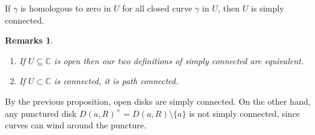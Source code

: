 \documentclass{article}
\theoremstyle{plain}\theoremheaderfont{\normalfont\itshape}\theorembodyfont{\rmfamily}\theoremseparator{.}\newtheorem*{rem}{Remark}\newtheorem*{ex}{Example}\newtheorem*{proof}{Proof}\newtheorem*{altp}{Alternative proof}\newtheorem*{con}{Consequences}\newtheorem*{notn}{Notations}\newtheorem*{cau}{Caution}\newtheorem*{term}{Terminology}\newtheorem*{keyex}{Key example}
\theoremstyle{plain}\theoremheaderfont{\normalfont\bfseries}\theorembodyfont{\rmfamily}\theoremseparator{.}\newtheorem{thm}{Theorem}[section]\newtheorem{lem}[thm]{Lemma}\newtheorem{prop}[thm]{Proposition}\newtheorem*{cor}{Corollary}\newtheorem{defn}[thm]{Definition}\newtheorem{clm}[thm]{Claim}\newtheorem{clminproof}{Claim}\newtheorem{leminproof}{Lemma}\newtheorem{app}{Application}
\theoremstyle{break}\theoremheaderfont{\normalfont\itshape}\theorembodyfont{\rmfamily}\theoremseparator{.\medskip}\newtheorem*{proofskip}{Proof}\newtheorem*{exs}{Examples}\newtheorem*{rems}{Remarks}\newtheorem*{rec}{Recall}\newtheorem*{ppts}{Properties}
\theoremstyle{break}\theoremheaderfont{\normalfont\bfseries}\theorembodyfont{\rmfamily}\theoremseparator{.\medskip}\newtheorem{lemskip}[thm]{Lemma}\newtheorem{defnskip}[thm]{Definition}\newtheorem{propskip}[thm]{Proposition}\newtheorem{thmskip}[thm]{Theorem}
\numberwithin{equation}{section}
\newcommand{\CC}{\mathbb{C}}
\begin{document}
    If \(\gamma\) is homologous to zero in \(U\) for all closed curve \(\gamma\) in \(U\), then \(U\) is simply connected.
    \begin{rems}
        \begin{enumerate}[topsep=0pt,label=(\roman*)]
            \item If \(U\subseteq\CC\) is open then our two definitions of simply connected are equivalent.
            \item If \(U\subset\CC\) is connected, it is path connected.
        \end{enumerate}
    \end{rems}
    By the previous proposition, open disks are simply connected. On the other hand, any punctured disk \(D(a,R)^\times=D(a,R)\setminus\{a\}\) is not simply connected, since curves can wind around the puncture.
\end{document}
